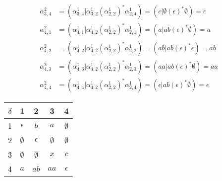 \documentclass{article}
\begin{document}
\begin{align*}
\alpha^2_{3,4} &= \left(\alpha^1_{3,4}|\alpha^1_{3,2}\left(\alpha^1_{2,2}\right)^*\alpha^1_{2,4}\right) = \left(c|\emptyset\left(\epsilon\right)^*\emptyset\right) = c \\
\alpha^2_{4,1} &= \left(\alpha^1_{4,1}|\alpha^1_{4,2}\left(\alpha^1_{2,2}\right)^*\alpha^1_{2,1}\right) = \left(a|ab\left(\epsilon\right)^*\emptyset\right) = a \\
\alpha^2_{4,2} &= \left(\alpha^1_{4,2}|\alpha^1_{4,2}\left(\alpha^1_{2,2}\right)^*\alpha^1_{2,2}\right) = \left(ab|ab\left(\epsilon\right)^*\epsilon\right) = ab \\
\alpha^2_{4,3} &= \left(\alpha^1_{4,3}|\alpha^1_{4,2}\left(\alpha^1_{2,2}\right)^*\alpha^1_{2,3}\right) = \left(aa|ab\left(\epsilon\right)^*\emptyset\right) = aa \\
\alpha^2_{4,4} &= \left(\alpha^1_{4,4}|\alpha^1_{4,2}\left(\alpha^1_{2,2}\right)^*\alpha^1_{2,4}\right) = \left(\epsilon|ab\left(\epsilon\right)^*\emptyset\right) = \epsilon
\end{align*}

\begin{center}
\begin{tabular}{c||*{3}{c|}c}
$\delta$ & 1 & 2 & 3 & 4 \\
  \hline \hline
1 & $\epsilon$  & $b$         & $a$         & $\emptyset$ \\ \hline
2 & $\emptyset$ & $\epsilon$  & $\emptyset$ & $\emptyset$ \\ \hline
3 & $\emptyset$ & $\emptyset$ & $x$         & $c$         \\ \hline
4 & $a$         & $ab$        & $aa$        & $\epsilon$  \\
\end{tabular}
\end{center}
\end{document}
